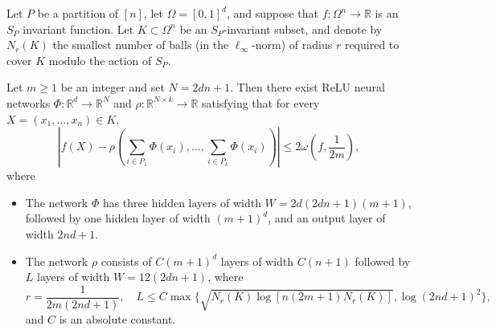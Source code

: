\documentclass[twoside,11pt]{article}
\begin{document}
\begin{theorem}\label{main-deep-sets-approximation-theorem}
	Let $P$ be a partition of $[n]$, let $\Omega = [0,1]^d$, and suppose that $f:\Omega^n\rightarrow \mathbb{R}$ is an $S_P$ invariant function. Let $K\subset \Omega^n$ be an $S_P$-invariant subset, and denote by $N_r(K)$ the smallest number of balls (in the $\ell_\infty$-norm) of radius $r$ required to cover $K$ modulo the action of $S_P$.
	
	Let $m \geq 1$ be an integer and set $N = 2dn+1$. Then there exist ReLU neural networks $\Phi:\mathbb{R}^d\rightarrow \mathbb{R}^N$ and $\rho:\mathbb{R}^{N\times k}\rightarrow \mathbb{R}$ satisfying that 	for every $X = (x_1,...,x_n)\in K$,
		\begin{equation}\label{deep-sets-equation-bound}
		\left|f(X) - \rho\left(\sum_{i\in P_1}\Phi(x_i),...,\sum_{i\in P_k}\Phi(x_i)\right)\right| \leq 2\omega\left(f,\frac{1}{2m}\right),
	\end{equation}
	where
	\begin{itemize}
		\item The network $\Phi$ has three hidden layers of width $W = 2d(2dn+1)(m+1)$, followed by one hidden layer of width $(m+1)^d$, and an output layer of width $2nd+1$.
		\item The network $\rho$ consists of $C(m+1)^d$ layers of width $C(n+1)$ followed by $L$ layers of width $W = 12(2dn+1)$, where
		$$r = \frac{1}{2m(2nd+1)}, \quad L \leq C\max\{\sqrt{N_r(K)\log[n(2m+1)N_r(K)]},\log(2nd+1)^2\},$$
	and $C$ is an absolute constant.
	\end{itemize}
\end{theorem}
\end{document}
